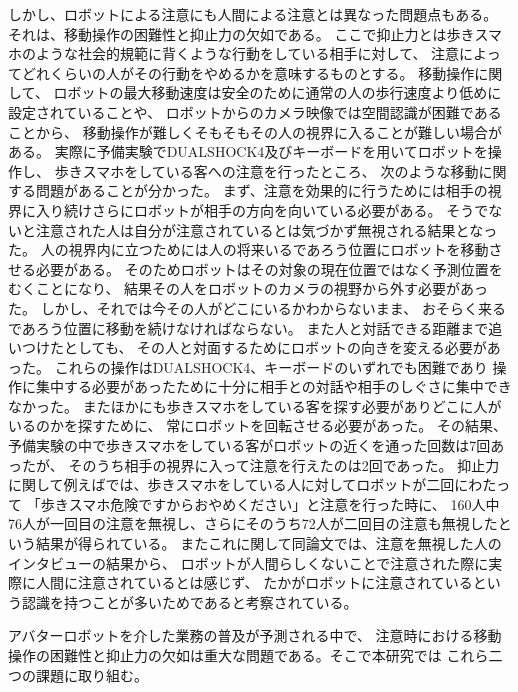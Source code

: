 \documentclass{kuisthesis}
\begin{document}
しかし、ロボットによる注意にも人間による注意とは異なった問題点もある。
それは、移動操作の困難性と抑止力の欠如である。
ここで抑止力とは歩きスマホのような社会的規範に背くような行動をしている相手に対して、
注意によってどれくらいの人がその行動をやめるかを意味するものとする。
移動操作に関して、
ロボットの最大移動速度は安全のために通常の人の歩行速度より低めに設定されていることや、
ロボットからのカメラ映像では空間認識が困難であることから、
移動操作が難しくそもそもその人の視界に入ることが難しい場合がある。
実際に予備実験でDUALSHOCK4及びキーボードを用いてロボットを操作し、
歩きスマホをしている客への注意を行ったところ、
次のような移動に関する問題があることが分かった。
まず、注意を効果的に行うためには相手の視界に入り続けさらにロボットが相手の方向を向いている必要がある。
そうでないと注意された人は自分が注意されているとは気づかず無視される結果となった。
人の視界内に立つためには人の将来いるであろう位置にロボットを移動させる必要がある。
そのためロボットはその対象の現在位置ではなく予測位置をむくことになり、
結果その人をロボットのカメラの視野から外す必要があった。
しかし、それでは今その人がどこにいるかわからないまま、
おそらく来るであろう位置に移動を続けなければならない。
また人と対話できる距離まで追いつけたとしても、
その人と対面するためにロボットの向きを変える必要があった。
これらの操作はDUALSHOCK4、キーボードのいずれでも困難であり
操作に集中する必要があったために十分に相手との対話や相手のしぐさに集中できなかった。
またほかにも歩きスマホをしている客を探す必要がありどこに人がいるのかを探すために、
常にロボットを回転させる必要があった。
その結果、予備実験の中で歩きスマホをしている客がロボットの近くを通った回数は7回あったが、
そのうち相手の視界に入って注意を行えたのは2回であった。
抑止力に関して例えば\cite{Schneider2022}では、歩きスマホをしている人に対してロボットが二回にわたって
「歩きスマホ危険ですからおやめください」と注意を行った時に、
160人中76人が一回目の注意を無視し、さらにそのうち72人が二回目の注意も無視したという結果が得られている。
またこれに関して同論文では、注意を無視した人のインタビューの結果から、
ロボットが人間らしくないことで注意された際に実際に人間に注意されているとは感じず、
たかがロボットに注意されているという認識を持つことが多いためであると考察されている。

アバターロボットを介した業務の普及が予測される中で、
注意時における移動操作の困難性と抑止力の欠如は重大な問題である。そこで本研究では
これら二つの課題に取り組む。
\end{document}
